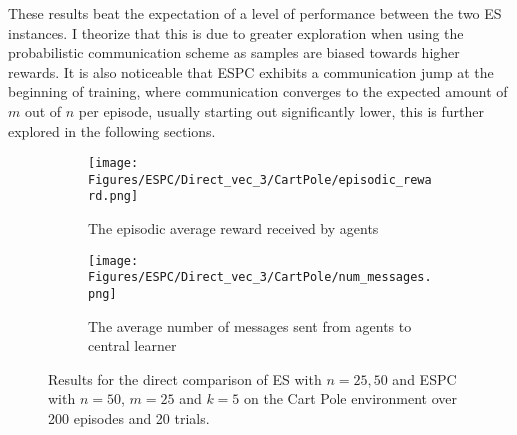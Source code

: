 These results beat the expectation of a level of performance between the two ES instances. I theorize that this is due to greater exploration when using the probabilistic communication scheme as samples are biased towards higher rewards. It is also noticeable that ESPC exhibits a communication jump at the beginning of training, where communication converges to the expected amount of $m$ out of $n$ per episode, usually starting out significantly lower, this is further explored in the following sections.
\begin{figure}[H]
    \centering
    \begin{subfigure}{0.4\textwidth}
        \centering
        \texttt{[image: Figures/ESPC/Direct\_vec\_3/CartPole/episodic\_reward.png]}
        \caption{The episodic average reward received by agents}
        \label{fig:CPEpisodicReward}
    \end{subfigure}
    \begin{subfigure}{0.4\textwidth}
        \centering
        \texttt{[image: Figures/ESPC/Direct\_vec\_3/CartPole/num\_messages.png]}
        \caption{The average number of messages sent from agents to central learner}
        \label{fig:CPMessages}
    \end{subfigure}
    \caption{Results for the direct comparison of ES with $n=25,50$ and ESPC with $n=50$, $m=25$ and $k=5$ on the Cart Pole environment over 200 episodes and 20 trials.}
    \label{fig:DirectCP}
\end{figure}

